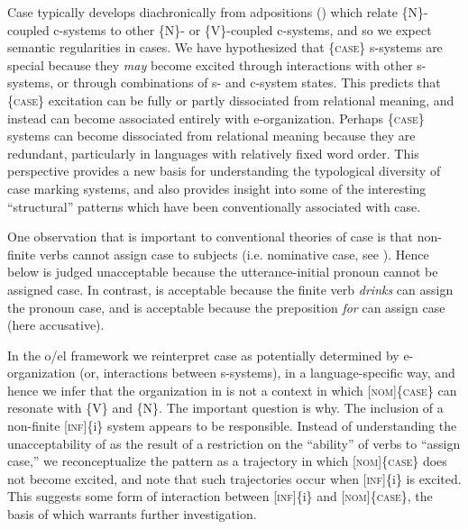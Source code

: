   Case typically develops diachronically from adpositions (\citealt{Heine2009,TraugottHeine1991}) which relate \{N\}-coupled c-systems to other \{N\}- or \{V\}-coupled c-systems, and so we expect semantic regularities in cases. We have hypothesized that \{\textsc{case}\} s-systems are special because they \textit{may} become excited through interactions with other s-systems, or through combinations of s- and c-system states. This predicts that \{\textsc{case}\} excitation can be fully or partly dissociated from relational meaning, and instead can become associated entirely with e-organization. Perhaps \{\textsc{case}\} systems can become dissociated from relational meaning because they are redundant, particularly in languages with relatively fixed word order. This perspective provides a new basis for understanding the typological diversity of case marking systems, and also provides insight into some of the interesting “structural” patterns which have been conventionally associated with case. 

  One observation that is important to conventional theories of case is that non-finite verbs cannot assign case to subjects (i.e. nominative case, see \citealt{Chomsky1980,ChomskyLasnik1977,Vergnaud2006}). Hence  below is judged unacceptable because the utterance-initial pronoun cannot be assigned case. In contrast,  is acceptable because the finite verb \textit{drinks} can assign the pronoun case, and  is acceptable because the preposition \textit{for} can assign case (here accusative).

\ea\label{ex:4:1}


\z
\z

  In the o/el framework we reinterpret case as potentially determined by e-organization (or, interactions between s-systems), in a language-specific way, and hence we infer that the organization in  is not a context in which [\textsc{nom}]\{\textsc{case}\} can resonate with \{V\} and \{N\}. The important question is why. The inclusion of a non-finite [\textsc{inf}]\{i\} system appears to be responsible. Instead of understanding the unacceptability of  as the result of a restriction on the “ability” of verbs to “assign case,” we reconceptualize the pattern as a trajectory in which [\textsc{nom}]\{\textsc{case}\} does not become excited, and note that such trajectories occur when [\textsc{inf}]\{i\} is excited. This suggests some form of interaction between [\textsc{inf}]\{i\} and [\textsc{nom}]\{\textsc{case}\}, the basis of which warrants further investigation.

